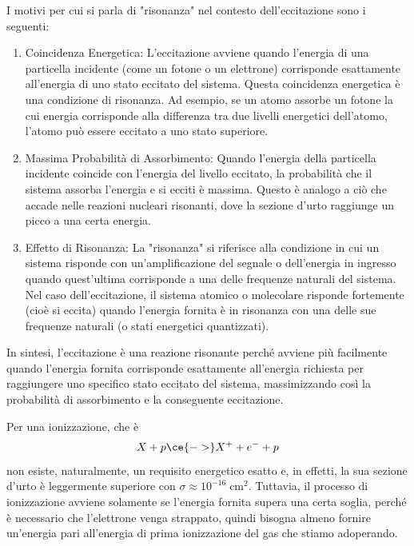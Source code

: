 \begin{approfondimento}
   I motivi per cui si parla di "risonanza" nel contesto dell'eccitazione sono i seguenti:
   \begin{enumerate}[leftmargin=0.5cm]
      \item Coincidenza Energetica: L'eccitazione avviene quando l'energia di una particella incidente (come un fotone o un elettrone) corrisponde esattamente all'energia di uno stato eccitato del sistema. Questa coincidenza energetica è una condizione di risonanza. Ad esempio, se un atomo assorbe un fotone la cui energia corrisponde alla differenza tra due livelli energetici dell'atomo, l'atomo può essere eccitato a uno stato superiore.
      \item Massima Probabilità di Assorbimento: Quando l'energia della particella incidente coincide con l'energia del livello eccitato, la probabilità che il sistema assorba l'energia e si ecciti è massima. Questo è analogo a ciò che accade nelle reazioni nucleari risonanti, dove la sezione d'urto raggiunge un picco a una certa energia.
      \item Effetto di Risonanza: La "risonanza" si riferisce alla condizione in cui un sistema risponde con un'amplificazione del segnale o dell'energia in ingresso quando quest'ultima corrisponde a una delle frequenze naturali del sistema. Nel caso dell'eccitazione, il sistema atomico o molecolare risponde fortemente (cioè si eccita) quando l'energia fornita è in risonanza con una delle sue frequenze naturali (o stati energetici quantizzati).
   \end{enumerate}
   In sintesi, l'eccitazione è una reazione risonante perché avviene più facilmente quando l'energia fornita corrisponde esattamente all'energia richiesta per raggiungere uno specifico stato eccitato del sistema, massimizzando così la probabilità di assorbimento e la conseguente eccitazione.
\end{approfondimento}

Per una ionizzazione, che è
\begin{equation*}
   X + p \ce{->} X^+ + e^- + p
\end{equation*}
non esiste, naturalmente, un requisito energetico esatto e, in effetti, la sua sezione d'urto è leggermente superiore con $\sigma \approx 10^{-16} \; \text{cm}^2$. Tuttavia, il processo di ionizzazione avviene solamente se l'energia fornita supera una certa soglia, perché è necessario che l'elettrone venga strappato, quindi bisogna almeno fornire un'energia pari all'energia di prima ionizzazione del gas che stiamo adoperando.

